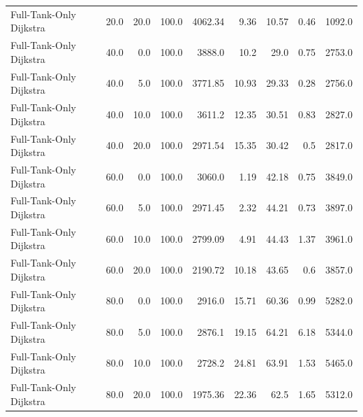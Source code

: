 \begin{tabular}{lrrrrrrrr}
Full-Tank-Only Dijkstra & 20.0 & 20.0 & 100.0 & 4062.34 & 9.36 & 10.57 & 0.46 & 1092.0 \\
Full-Tank-Only Dijkstra & 40.0 & 0.0 & 100.0 & 3888.0 & 10.2 & 29.0 & 0.75 & 2753.0 \\
Full-Tank-Only Dijkstra & 40.0 & 5.0 & 100.0 & 3771.85 & 10.93 & 29.33 & 0.28 & 2756.0 \\
Full-Tank-Only Dijkstra & 40.0 & 10.0 & 100.0 & 3611.2 & 12.35 & 30.51 & 0.83 & 2827.0 \\
Full-Tank-Only Dijkstra & 40.0 & 20.0 & 100.0 & 2971.54 & 15.35 & 30.42 & 0.5 & 2817.0 \\
Full-Tank-Only Dijkstra & 60.0 & 0.0 & 100.0 & 3060.0 & 1.19 & 42.18 & 0.75 & 3849.0 \\
Full-Tank-Only Dijkstra & 60.0 & 5.0 & 100.0 & 2971.45 & 2.32 & 44.21 & 0.73 & 3897.0 \\
Full-Tank-Only Dijkstra & 60.0 & 10.0 & 100.0 & 2799.09 & 4.91 & 44.43 & 1.37 & 3961.0 \\
Full-Tank-Only Dijkstra & 60.0 & 20.0 & 100.0 & 2190.72 & 10.18 & 43.65 & 0.6 & 3857.0 \\
Full-Tank-Only Dijkstra & 80.0 & 0.0 & 100.0 & 2916.0 & 15.71 & 60.36 & 0.99 & 5282.0 \\
Full-Tank-Only Dijkstra & 80.0 & 5.0 & 100.0 & 2876.1 & 19.15 & 64.21 & 6.18 & 5344.0 \\
Full-Tank-Only Dijkstra & 80.0 & 10.0 & 100.0 & 2728.2 & 24.81 & 63.91 & 1.53 & 5465.0 \\
Full-Tank-Only Dijkstra & 80.0 & 20.0 & 100.0 & 1975.36 & 22.36 & 62.5 & 1.65 & 5312.0 \\
\hline
\end{tabular}
